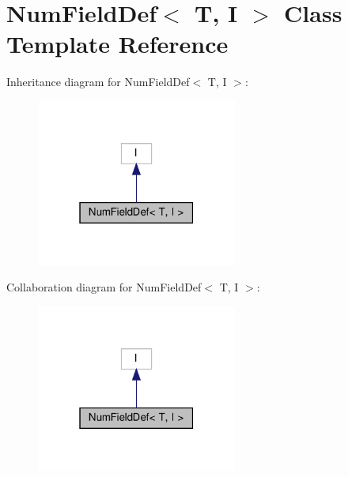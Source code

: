 \hypertarget{classNumFieldDef}{}\section{Num\+Field\+Def$<$ T, I $>$ Class Template Reference}
\label{classNumFieldDef}


Inheritance diagram for Num\+Field\+Def$<$ T, I $>$\+:\nopagebreak
\begin{figure}[H]
\begin{center}
\leavevmode
\includegraphics[width=187pt]{classNumFieldDef__inherit__graph}
\end{center}
\end{figure}


Collaboration diagram for Num\+Field\+Def$<$ T, I $>$\+:\nopagebreak
\begin{figure}[H]
\begin{center}
\leavevmode
\includegraphics[width=187pt]{classNumFieldDef__coll__graph}
\end{center}
\end{figure}
